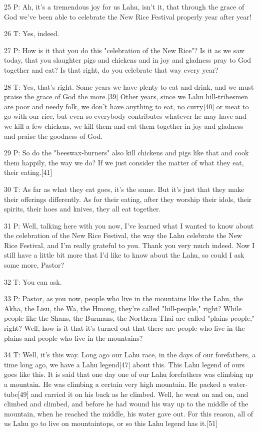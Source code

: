 {25 P: Ah, it's a tremendous joy for us Lahu, isn't it, that through the
grace of God we've been able to celebrate the New Rice Festival properly year after
year! }

{26 T: Yes, indeed.}

{27 P: How is it that you do this "celebration of the New Rice"?
Is it as we saw today, that you slaughter pigs and chickens and in joy and gladness
pray to God together and eat? Is that right, do you celebrate that way every year?
}

{28 T: Yes, that's right. Some years we have plenty to eat and drink, and
we must praise the grace of God the more.[39] Other years, since we Lahu hill-tribesmen
are poor and needy folk, we don't have anything to eat, no curry[40] or meat to
go with our rice, but even so everybody contributes whatever he may have and we
kill a few chickens, we kill them and eat them together in joy and gladness and
praise the goodness of God. }

{29 P: So do the "beeswax-burners" also kill chickens
and pigs like that and cook them happily, the way we do? If we just consider the
matter of what they eat, their eating.[41]}

{30 T: As far as what they eat goes, it's the same. But it's just that they
make their offerings differently. As for their eating, after they worship their
idols, their spirits, their hoes and knives, they all eat together. }

{31 P: Well, talking here with you now, I've learned what I wanted to know
about the celebration of the New Rice Festival, the way the Lahu celebrate the
New Rice Festival, and I'm really grateful to you. Thank you very much indeed.
Now I still have a little bit more that I'd like to know about the Lahu, so could
I ask some more, Pastor?}

{32 T: You can ask.}

{33 P: Pastor, as you now, people who live in the mountains like the Lahu,
the Akha, the Lisu, the Wa, the Hmong, they're called "hill-people,"
right? While people like the Shans, the Burmans, the Northern Thai are called "plains-people,"
right? Well, how is it that it's turned out that there are people who live in the
plains and people who live in the mountains? }

{34 T: Well, it's this way. Long ago our Lahu race, in the days of our forefathers,
a time long ago, we have a Lahu legend[47] about this. This Lahu legend of ours
goes like this. It is said that one day one of our Lahu forefathers was climbing
up a mountain. He was climbing a certain very high mountain. He packed a water-tube[49]
and carried it on his back as he climbed. Well, he went on and on, and climbed
and climbed, and before he had wound his way up to the middle of the mountain,
when he reached the middle, his water gave out. For this reason, all of us Lahu
go to live on mountaintops, or so this Lahu legend has it.[51]}

